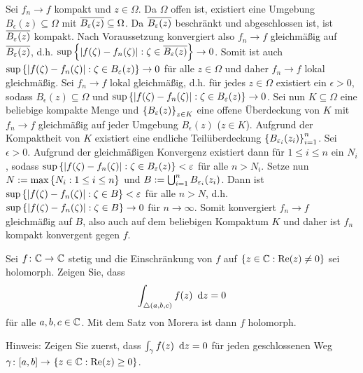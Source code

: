\begin{exercisePage}
	\begin{equivalence}
		\hinrichtung Sei $f_n \to f$ kompakt und $z \in \Omega$. Da $\Omega$ offen ist, existiert eine Umgebung $B_\epsilon(z) \subseteq \Omega$ mit $\overline{B_\varepsilon(z)} \subseteq \Omega$. Da $\overline{B_\varepsilon(z)}$ beschränkt und abgeschlossen ist, ist $\overline{B_\varepsilon(z)}$ kompakt. Nach Voraussetzung konvergiert also $f_n \to f$ gleichmäßig auf $\overline{B_\varepsilon(z)}$, d.h. $\sup\left\{ \left| f(\zeta) - f_n(\zeta) \right| : \zeta \in \overline{B_\varepsilon(z)} \right\} \to 0$. Somit ist auch $\sup\left\{ \left| f(\zeta) - f_n(\zeta) \right| : \zeta \in B_\varepsilon(z) \right\} \to 0$ für alle $z \in \Omega$ und daher $f_n \to f$ lokal gleichmäßig.
		\rueckrichtung Sei $f_n \to f$ lokal gleichmäßig, d.h. für jedes $z \in \Omega$ existiert ein $\epsilon > 0$, sodass $B_\epsilon(z) \subseteq \Omega$ und $\sup\left\{ \left| f(\zeta) - f_n(\zeta) \right| : \zeta \in B_\varepsilon(z) \right\} \to 0$. Sei nun $K \subseteq \Omega$ eine beliebige kompakte Menge und $\left\{ B_\varepsilon(z) \right\}_{z \in K}$ eine offene Überdeckung von $K$ mit $f_n \to f$ gleichmäßig auf jeder Umgebung $B_\epsilon(z)$ ($z \in K$). Aufgrund der Kompaktheit von $K$ existiert eine endliche Teilüberdeckung $\left\{ B_{\varepsilon_i}(z_i) \right\}_{i=1}^n$. Sei $\epsilon > 0$. Aufgrund der gleichmäßigen Konvergenz existiert dann für $1 \le i \le n$ ein $N_i$, sodass $\sup\left\{ \left| f(\zeta) - f_n(\zeta) \right| : \zeta \in B_\varepsilon(z) \right\} < \varepsilon$ für alle $n > N_i$. Setze nun $N \mathrel{:=} \max\left\{ N_i : 1 \le i \le n \right\}$ und $B \mathrel{:=} \bigcup_{i=1}^n B_{\varepsilon_i}(z_i)$. Dann ist $\sup\left\{ \left| f(\zeta) - f_n(\zeta) \right| : \zeta \in B \right\} < \varepsilon$ für alle $n > N$, d.h. $\sup\left\{ \left| f(\zeta) - f_n(\zeta) \right| : \zeta \in B \right\} \to 0$ für $n \to \infty$. Somit konvergiert $f_n \to f$ gleichmäßig auf $B$, also auch auf dem beliebigen Kompaktum $K$ und daher ist $f_n$ kompakt konvergent gegen $f$.
	\end{equivalence}

	
	\begin{task}
		Sei $\abb{f}{\CC}{\CC}$ stetig und die Einschränkung von $f$ auf $\left\{ z \in \mathbb{C} : \operatorname{Re}(z) \neq 0 \right\}$ sei holomorph. Zeigen Sie, dass
		\begin{equation*}
			\int_{\triangle(a,b,c)} f(z) \enskip \mathrm{d}z = 0
		\end{equation*} 
		für alle $a,b,c \in \mathbb{C}$. Mit dem Satz von Morera ist dann $f$ holomorph. 
		
		Hinweis: Zeigen Sie zuerst, dass $\int_\gamma f(z) \enskip \mathrm{d}z = 0$ für jeden geschlossenen Weg $\abb{\gamma}{[a,b]}{\menge{z \in \CC : \Re(z) \ge 0}}$.
	\end{task}


\end{exercisePage}
